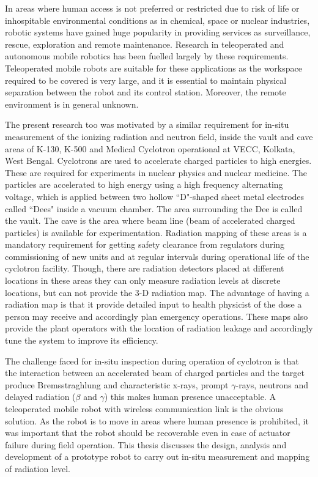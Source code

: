  In areas where human access is not preferred or restricted  due to risk of life or inhospitable environmental conditions as in chemical, space or nuclear industries, robotic systems have gained huge popularity in providing services as surveillance, rescue, exploration and remote maintenance.  Research in teleoperated and autonomous mobile robotics has been fuelled largely by these  requirements. Teleoperated mobile robots are suitable for these applications  as the workspace required to be covered is very large, and it is essential to maintain  physical separation between the robot and its control station. Moreover, the remote environment is in general unknown. 
 
 The present research too was motivated by a similar requirement for in-situ measurement of the ionizing radiation and  neutron field, inside the vault and cave areas of   K-130,  K-500  and Medical Cyclotron operational at VECC, Kolkata, West Bengal. Cyclotrons are used to accelerate  charged particles to high energies. These are required for experiments in nuclear physics and nuclear medicine. The particles are accelerated to high energy using a high frequency alternating voltage, which is applied between two hollow ``D"-shaped sheet metal electrodes called ``Dees" inside a vacuum chamber. The area surrounding the Dee is called the vault.  The cave is the area where beam line (beam of  accelerated charged particles) is available for experimentation. Radiation mapping of these areas is a  mandatory requirement for getting safety clearance from regulators during  commissioning of new units and at regular intervals during operational life of the cyclotron facility.   Though, there are radiation detectors placed at different locations in these areas they can only measure radiation levels at discrete locations, but can not provide the 3-D radiation  map. The advantage of having a  radiation map is that it  provide detailed  input to health physicist  of the dose a person may receive and accordingly plan emergency  operations. These maps also provide the plant operators with the location of radiation leakage and accordingly tune the system to improve its efficiency.

The challenge faced for in-situ inspection during operation of cyclotron is that the interaction  between  an  accelerated  beam   of  charged  particles  and  the  target  produce Bremsstraghlung and characteristic x-rays, prompt $\gamma$-rays, neutrons and delayed radiation ($\beta $ and $\gamma$) this makes human presence unacceptable.  A teleoperated mobile robot with wireless communication link is the obvious solution. As the robot is to move in areas where human presence is prohibited, it was important that the robot should be recoverable even in case of actuator failure during field operation.  This thesis discusses the design, analysis and development of a prototype robot  to carry out in-situ measurement and mapping of radiation level.


